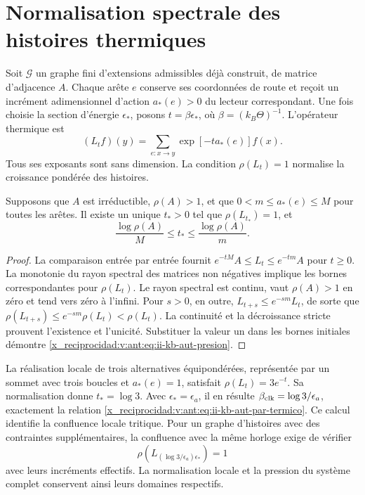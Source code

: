 \section{Normalisation spectrale des histoires thermiques}

Soit \(\mathcal G\) un graphe fini d'extensions admissibles déjà
construit, de matrice d'adjacence \(A\). Chaque arête \(e\) conserve
ses coordonnées de route et reçoit un incrément adimensionnel d'action
\(a_*(e)>0\) du lecteur correspondant. Une fois choisie la section d'énergie
\(\epsilon_*\), posons \(t=\beta\epsilon_*\), où
\(\beta=(k_B\Theta)^{-1}\). L'opérateur thermique est
\begin{equation}
 (L_tf)(y)=\sum_{e:x\to y}\exp[-t a_*(e)]f(x).
 \label{x_reciprocidad:v:ant:eq:ii-kb-aut-operador}
\end{equation}
Tous ses exposants sont sans dimension. La condition
\(\rho(L_t)=1\) normalise la croissance pondérée des histoires.

\begin{proposition}
Supposons que \(A\) est irréductible, \(\rho(A)>1\), et que
\(0<m\leq a_*(e)\leq M\) pour toutes les arêtes. Il existe un unique
\(t_*>0\) tel que \(\rho(L_{t_*})=1\), et
\begin{equation}
 \frac{\log\rho(A)}{M}\leq t_*\leq
 \frac{\log\rho(A)}{m}.
 \label{x_reciprocidad:v:ant:eq:ii-kb-aut-presion}
\end{equation}
\end{proposition}
\begin{proof}
La comparaison entrée par entrée fournit \(e^{-tM}A\leq L_t\leq e^{-tm}A\) pour \(t\geq0\). La monotonie du rayon spectral des matrices non négatives implique les bornes correspondantes pour \(\rho(L_t)\). Le rayon spectral est continu, vaut \(\rho(A)>1\) en zéro et tend vers zéro à l'infini. Pour \(s>0\), en outre, \(L_{t+s}\leq e^{-sm}L_t\), de sorte que \(\rho(L_{t+s})\leq e^{-sm}\rho(L_t)<\rho(L_t)\). La continuité et la décroissance stricte prouvent l'existence et l'unicité. Substituer la valeur un dans les bornes initiales démontre \eqref{x_reciprocidad:v:ant:eq:ii-kb-aut-presion}.
\end{proof}

La réalisation locale de trois alternatives équipondérées, représentée
par un sommet avec trois boucles et \(a_*(e)=1\), satisfait
\(\rho(L_t)=3e^{-t}\). Sa normalisation donne \(t_*=\log3\).
Avec \(\epsilon_*=\epsilon_a\), il en résulte
\(\beta_{\rm clk}=\log3/\epsilon_a\), exactement la relation
\eqref{x_reciprocidad:v:ant:eq:ii-kb-aut-par-termico}. Ce calcul identifie la
confluence locale tritique. Pour un graphe d'histoires avec des contraintes
supplémentaires, la confluence avec la même horloge exige de vérifier
\[
 \rho\!\left(L_{(\log3/\epsilon_a)\epsilon_*}\right)=1
\]
avec leurs incréments effectifs. La normalisation locale et la pression
du système complet conservent ainsi leurs domaines respectifs.

